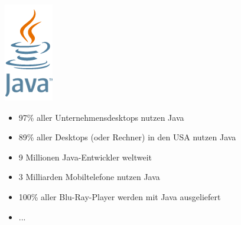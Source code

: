 \documentclass{beamer}
\begin{document}
\begin{frame}
\begin{minipage}{.15\textwidth}
			\includegraphics[width=\textwidth]{javalogo}
		\end{minipage}
		\begin{minipage}{.83\textwidth}
			\begin{itemize}
				\item 97\% aller Unternehmensdesktops nutzen Java
				\item 89\% aller Desktops (oder Rechner) in den USA nutzen Java
				\item 9 Millionen Java-Entwickler weltweit
				\item 3 Milliarden Mobiltelefone nutzen Java
				\item 100\% aller Blu-Ray-Player werden mit Java ausgeliefert
				\item ...
			\end{itemize}
		\end{minipage}
	\end{frame}
\end{document}

